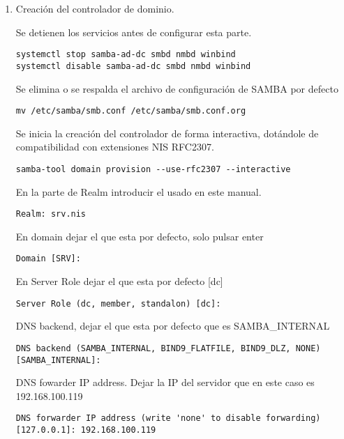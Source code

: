 \documentclass[../main.tex]{subfiles}
\begin{document}
\begin{enumerate}
\begin{enumerate}
  
    \end{enumerate}

  \item Creación del controlador de dominio.

    Se detienen los servicios antes de configurar esta parte.

    \begin{lstlisting}
systemctl stop samba-ad-dc smbd nmbd winbind
systemctl disable samba-ad-dc smbd nmbd winbind
\end{lstlisting}

    Se elimina o se respalda el archivo de configuración de
    SAMBA por defecto
    \begin{lstlisting}
mv /etc/samba/smb.conf /etc/samba/smb.conf.org
\end{lstlisting}

    Se inicia la creación del controlador de forma interactiva, dotándole de compatibilidad con extensiones NIS RFC2307.

    \begin{lstlisting}
samba-tool domain provision --use-rfc2307 --interactive
\end{lstlisting}

    En la parte de Realm introducir el usado en este manual.

    \begin{lstlisting}
Realm: srv.nis
\end{lstlisting}

    En domain dejar el que esta por defecto, solo pulsar enter

    \begin{lstlisting}
Domain [SRV]:
\end{lstlisting}

    En Server Role dejar el que esta por defecto [dc]

    \begin{lstlisting}
Server Role (dc, member, standalon) [dc]:
    \end{lstlisting}

    DNS backend, dejar el que esta por defecto que es SAMBA\_INTERNAL

    \begin{lstlisting}
DNS backend (SAMBA_INTERNAL, BIND9_FLATFILE, BIND9_DLZ, NONE) [SAMBA_INTERNAL]:
\end{lstlisting}

    DNS fowarder IP address. Dejar la IP del servidor que en este caso es 192.168.100.119

    \begin{lstlisting}
DNS forwarder IP address (write 'none' to disable forwarding) [127.0.0.1]: 192.168.100.119
\end{lstlisting}


\end{enumerate}
\end{document}
